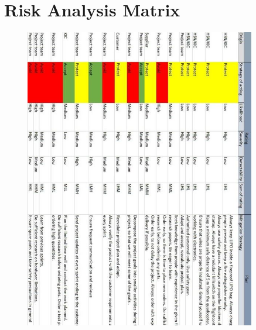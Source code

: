 \chapter{Risk Analysis Matrix}
\label{app:riskmatrix}

\begin{figure}[H]
    \centering
    \includegraphics[width = 0.9\textwidth]{VAPIQ-PICTURES/RiskMatrix3}
\end{figure}